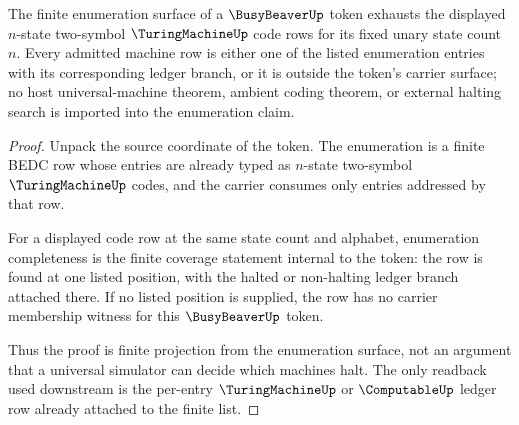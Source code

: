 \begin{theorem}
\label{thm:busybeaver-enumeration-completeness}
The finite enumeration surface of a $\BusyBeaverUp$ token exhausts the displayed
$n$-state two-symbol $\TuringMachineUp$ code rows for its fixed unary state
count $n$. Every admitted machine row is either one of the listed enumeration
entries with its corresponding ledger branch, or it is outside the token's
carrier surface; no host universal-machine theorem, ambient coding theorem, or
external halting search is imported into the enumeration claim.
\end{theorem}
\begin{proof}
Unpack the source coordinate of the token. The enumeration is a finite BEDC row
whose entries are already typed as $n$-state two-symbol $\TuringMachineUp$
codes, and the carrier consumes only entries addressed by that row.

For a displayed code row at the same state count and alphabet, enumeration
completeness is the finite coverage statement internal to the token: the row is
found at one listed position, with the halted or non-halting ledger branch
attached there. If no listed position is supplied, the row has no carrier
membership witness for this $\BusyBeaverUp$ token.

Thus the proof is finite projection from the enumeration surface, not an
argument that a universal simulator can decide which machines halt. The only
readback used downstream is the per-entry $\TuringMachineUp$ or
$\ComputableUp$ ledger row already attached to the finite list.
\end{proof}


